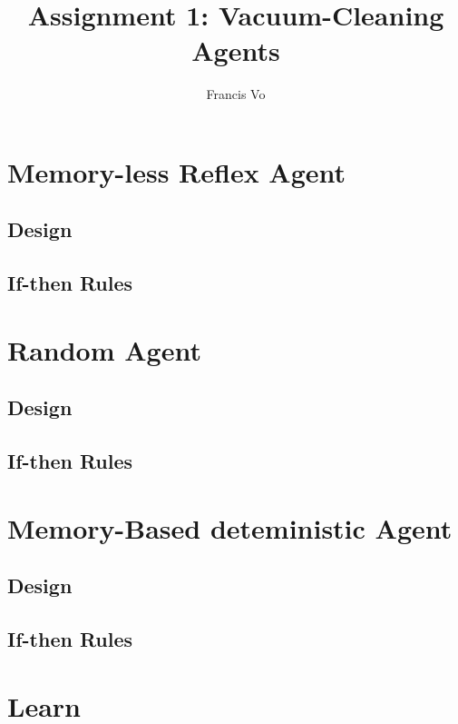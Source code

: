 \documentclass[a4paper,10pt]{article}
\title{Assignment 1: Vacuum-Cleaning Agents}
\author{Francis Vo}
\begin{document}
\maketitle

\section{Memory-less Reflex Agent}
\subsection{Design}
\subsection{If-then Rules}
\section{Random Agent}
\subsection{Design}
\subsection{If-then Rules}
\section{Memory-Based deteministic Agent}
\subsection{Design}
\subsection{If-then Rules}
\section{Learn}
\end{document}
